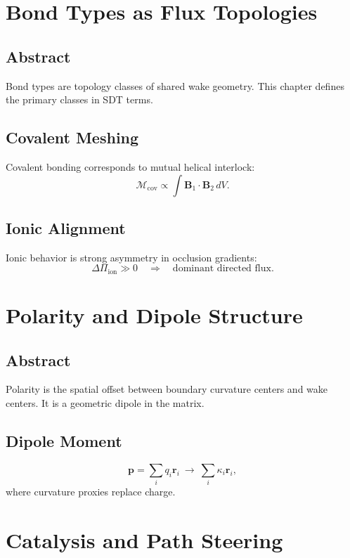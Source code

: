 \documentclass[12pt]{book}
\begin{document}
\chapter{Bond Types as Flux Topologies}

\section*{Abstract}
Bond types are topology classes of shared wake geometry. This chapter defines the primary classes in SDT
terms.

\section{Covalent Meshing}
Covalent bonding corresponds to mutual helical interlock:
\begin{equation}
\mathcal{M}_{\text{cov}} \propto \int \mathbf{B}_1 \cdot \mathbf{B}_2\, dV.
\end{equation}

\section{Ionic Alignment}
Ionic behavior is strong asymmetry in occlusion gradients:
\begin{equation}
\Delta \Pi_{\text{ion}} \gg 0 \quad \Rightarrow \quad \text{dominant directed flux}.
\end{equation}

\chapter{Polarity and Dipole Structure}

\section*{Abstract}
Polarity is the spatial offset between boundary curvature centers and wake centers. It is a geometric
dipole in the matrix.

\section{Dipole Moment}
\begin{equation}
\mathbf{p} = \sum_i q_i \mathbf{r}_i \ \rightarrow \ \sum_i \kappa_i \mathbf{r}_i,
\end{equation}
where curvature proxies replace charge.

\chapter{Catalysis and Path Steering}
\end{document}
